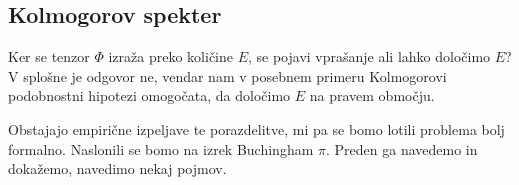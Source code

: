 \documentclass[mat2, tisk]{fmfdelo}
\begin{document}
\subsection{Kolmogorov spekter}

Ker se tenzor $\Phi$ izraža preko količine $E$, se pojavi vprašanje 
ali lahko določimo $E$? V splošne je odgovor ne, vendar nam v posebnem 
primeru Kolmogorovi podobnostni hipotezi omogočata, da določimo
$E$ na pravem območju.

Obstajajo empirične izpeljave te porazdelitve, mi pa se bomo lotili 
problema bolj formalno. Naslonili se bomo na izrek Buchingham $\pi$.
Preden ga navedemo in dokažemo, navedimo nekaj pojmov. 






\end{document}

